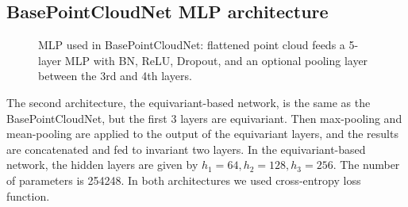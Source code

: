 \documentclass[english]{article}
\begin{document}
\subsection*{BasePointCloudNet MLP architecture}
\begin{figure}[h]
\centering
\newcommand{\npoints}{256}
\newcommand{\din}{3}
\newcommand{\dout}{40}
\newcommand{\hOne}{128}
\newcommand{\hTwo}{256}
\newcommand{\hThree}{256}
\newcommand{\dropoutp}{0.2}
\caption{MLP used in BasePointCloudNet: flattened point cloud feeds a 5-layer MLP with BN, ReLU, Dropout, and an optional pooling layer between the 3rd and 4th layers.}
\label{fig:basePointCloudNetMLP}
\end{figure}

The second architecture, the equivariant-based network, is the same as the BasePointCloudNet, but the first 3 layers are equivariant. Then max-pooling and mean-pooling are applied to the output of the equivariant layers, and the results are concatenated and fed to invariant two layers.
In the equivariant-based network, the hidden layers are given by $h_1 = 64, h_2 = 128, h_3 = 256$. The number of parameters is 254248. In both architectures we used cross-entropy loss function. 
\end{document}
